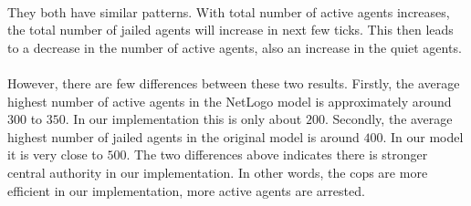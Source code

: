 \documentclass[11pt]{article}
\begin{document}
      \paragraph{}
      They both have similar patterns. With total number
      of active agents increases, the total number of jailed agents will increase
      in next few ticks. This then leads to a decrease in the number of active agents,
      also an increase in the quiet agents. 
      \paragraph{}
      However, there are few differences between these two results. Firstly, the
      average highest number of active agents in the NetLogo model is approximately
      around $300$ to $350$. In our implementation this is only about $200$.
      Secondly, the average highest number of jailed agents in the original model
      is around $400$. In our model it is very close to $500$. The two differences
      above indicates there is stronger central authority in our implementation.
      In other words, the cops are more efficient in our implementation, more
      active agents are arrested.
\end{document}
